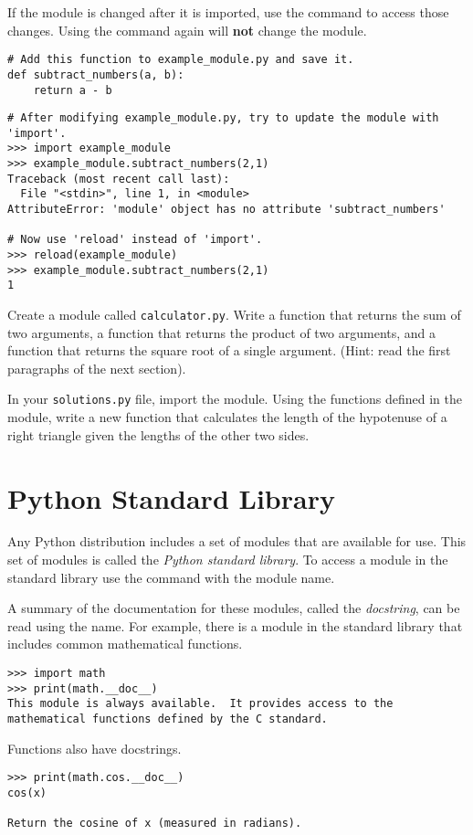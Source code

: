 If the module is changed after it is imported, use the  command to access those changes.
Using the  command again will \textbf{not} change the module.

\begin{lstlisting}
# Add this function to example_module.py and save it.
def subtract_numbers(a, b):
    return a - b
\end{lstlisting}

\begin{lstlisting}
# After modifying example_module.py, try to update the module with 'import'.
>>> import example_module
>>> example_module.subtract_numbers(2,1)
Traceback (most recent call last):
  File "<stdin>", line 1, in <module>
AttributeError: 'module' object has no attribute 'subtract_numbers'

# Now use 'reload' instead of 'import'.
>>> reload(example_module)
>>> example_module.subtract_numbers(2,1)
1
\end{lstlisting}

\begin{problem}
Create a module called \texttt{calculator.py}.
Write a function that returns the sum of two arguments, a function that returns the product of two arguments, and a function that returns the square root of a single argument.
(Hint: read the first paragraphs of the next section).

In your \texttt{solutions.py} file, import the  module.
Using the functions defined in the module, write a new function that calculates the length of the hypotenuse of a right triangle given the lengths of the other two sides.
\end{problem}

\section*{Python Standard Library}

Any Python distribution includes a set of modules that are available for use.
This set of modules is called the \emph{Python standard library}.
To access a module in the standard library use the  command with the module name.

A summary of the documentation for these modules, called the \emph{docstring}, can be read using the  name.
For example, there is a  module in the standard library that includes common mathematical functions.
\begin{lstlisting}
>>> import math
>>> print(math.__doc__)
This module is always available.  It provides access to the
mathematical functions defined by the C standard.
\end{lstlisting}
Functions also have docstrings.
\begin{lstlisting}
>>> print(math.cos.__doc__)
cos(x)

Return the cosine of x (measured in radians).
\end{lstlisting}

